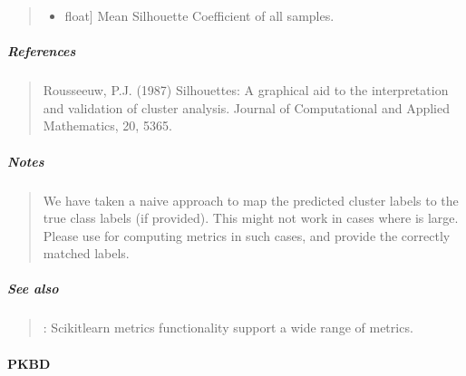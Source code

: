 \documentclass[letterpaper,10pt,english,openany,oneside]{sphinxmanual}
\begin{document}
\begin{fulllineitems}
\begin{quote}
\begin{description}
\begin{itemize}
\begin{description}
\end{description}

\item {} \begin{description}
\sphinxlineitem{Average Silhouette Score}{[}float{]}
\sphinxAtStartPar
Mean Silhouette Coefficient of all samples.

\end{description}

\end{itemize}

\end{description}
\end{quote}


\subparagraph{References}
\label{\detokenize{api_reference/generated/QuadratiK.spherical_clustering.PKBC:id5}}\begin{quote}

\sphinxAtStartPar
Rousseeuw, P.J. (1987) Silhouettes: A graphical aid to the interpretation and validation of cluster analysis. 
Journal of Computational and Applied Mathematics, 20, 53\textendash{}65.
\end{quote}


\subparagraph{Notes}
\label{\detokenize{api_reference/generated/QuadratiK.spherical_clustering.PKBC:notes}}\begin{quote}

\sphinxAtStartPar
We have taken a naive approach to map the predicted cluster labels 
to the true class labels (if provided). This might not work in cases where  is large.
Please use  for computing metrics in such cases, and provide the correctly
matched labels.
\end{quote}


\subparagraph{See also}
\label{\detokenize{api_reference/generated/QuadratiK.spherical_clustering.PKBC:see-also}}\begin{quote}

\sphinxAtStartPar
{} : Scikit\sphinxhyphen{}learn metrics functionality support a wide range of metrics.
\end{quote}

\end{fulllineitems}




\sphinxstepscope


\paragraph{PKBD}
\label{\detokenize{api_reference/generated/QuadratiK.spherical_clustering.PKBD:pkbd}}\label{\detokenize{api_reference/generated/QuadratiK.spherical_clustering.PKBD::doc}}
\end{document}

